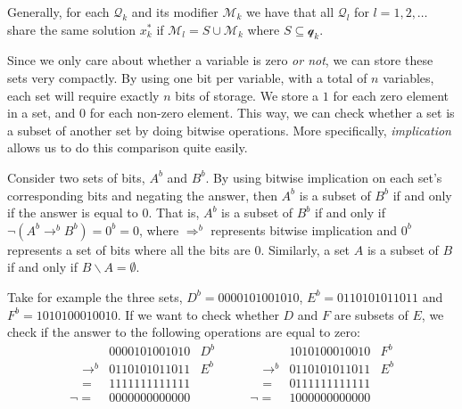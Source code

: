 Generally, for each $\mathcal{Q}_k$ and its modifier $\mathcal{M}_k$ we
have that all $\mathcal{Q}_l$ for $l=1,2,\ldots$ share the same solution
$x_k^*$ if $\mathcal{M}_l = S \cup \mathcal{M}_k$ where $S \subseteq 
\mathcal{q}_k$.

Since we only care about whether a variable is zero \emph{or not}, we can
store these sets very compactly. By using one bit per variable, with a total
of $n$ variables, each set will require exactly $n$ bits of storage. We
store a $1$ for each zero element in a set, and $0$ for each non-zero element.
This way, we can check whether a set is a subset of another set by doing
bitwise operations. More specifically, \emph{implication} allows us to do this
comparison quite easily.

Consider two sets of bits, $A^b$ and $B^b$. By using bitwise implication on
each set's corresponding bits and negating the answer, then $A^b$ is a subset
of $B^b$ if and only if the answer is equal to 0. That is, $A^b$ is a subset of
$B^b$ if and only if $\neg(A^b \rightarrow^b B^b) = 0^b = 0$, where
$\Rightarrow^b$ represents bitwise implication and $0^b$ represents a set of
bits where all the bits are $0$. Similarly, a set $A$ is a subset of $B$ if and
only if $B \backslash A = \emptyset$.

Take for example the three sets, $D^b = 0000101001010$, $E^b = 0110101011011$
and $F^b = 1010100010010$. If we want to check whether $D$ and $F$ are subsets
of $E$, we check if the answer to the following operations are equal to zero:
\[
\begin{array}{lrl}
                      & 0000101001010 & D^b \\
  \quad \rightarrow^b & 0110101011011 & E^b \\ \hline
  \quad =             & 1111111111111 \\
  \neg  =             & 0000000000000
\end{array}
\qquad
\begin{array}{lrl}
                      & 1010100010010 & F^b \\
  \quad \rightarrow^b & 0110101011011 & E^b \\ \hline
  \quad =             & 0111111111111 \\
  \neg  =             & 1000000000000
\end{array}
\]
